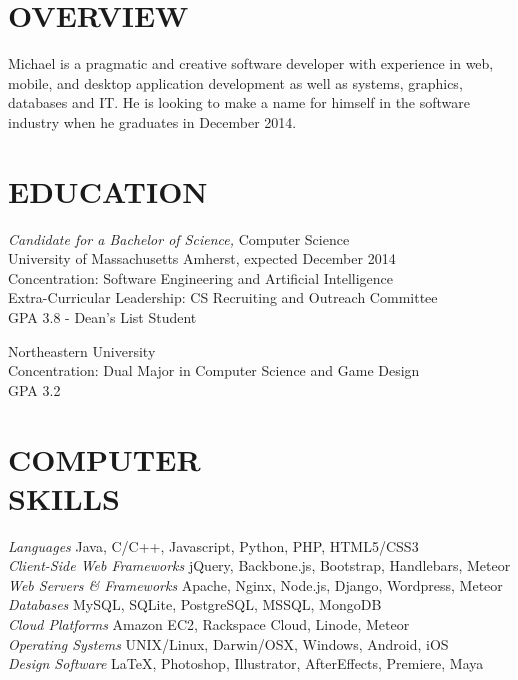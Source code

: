 \documentclass[line,margin]{res}
\begin{document}
\address{169 Brittany Mnr Apt F, Amherst, MA 01002}
\address{(781) 264-6283  --  mike@miketurley.com -- github.com/mturley}

\begin{resume}
 
\section{OVERVIEW}
    Michael is a pragmatic and creative software developer with experience in web, mobile, and desktop application development as well as systems, graphics, databases and IT.  He is looking to make a name for himself in the software industry when he graduates in December 2014.
 
 
\section{EDUCATION}
    {\sl Candidate for a Bachelor of Science,} Computer Science \\
    University of Massachusetts Amherst, 
    expected December 2014 \\
    Concentration: Software Engineering and Artificial Intelligence \\
    Extra-Curricular Leadership: CS Recruiting and Outreach Committee \\
    GPA 3.8 - Dean's List Student

    Northeastern University \\
    Concentration: Dual Major in Computer Science and Game Design \\
    GPA 3.2
 
 
\section{COMPUTER \\ SKILLS}
    {\sl Languages} \hfill Java, C/C++, Javascript, Python, PHP, HTML5/CSS3 \\
    {\sl Client-Side Web Frameworks} \hfill jQuery, Backbone.js, Bootstrap, Handlebars, Meteor \\
    {\sl Web Servers \& Frameworks} \hfill Apache, Nginx, Node.js, Django, Wordpress, Meteor \\
    {\sl Databases} \hfill MySQL, SQLite, PostgreSQL, MSSQL, MongoDB \\
    {\sl Cloud Platforms} \hfill Amazon EC2, Rackspace Cloud, Linode, Meteor \\
    {\sl Operating Systems} \hfill UNIX/Linux, Darwin/OSX, Windows, Android, iOS \\
    {\sl Design Software} \hfill \LaTeX, Photoshop, Illustrator, AfterEffects, Premiere, Maya
 

\end{resume}
\end{document}
